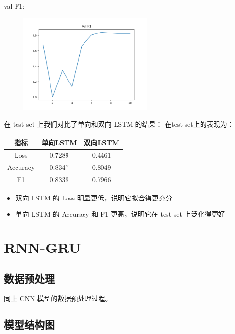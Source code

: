 \documentclass{article}
\begin{document}
\FloatBarrier

val F1:
\begin{figure}[h]
    \centering
    \includegraphics[width=0.6\textwidth]{../results/lstm_f1.png}
\end{figure}

\FloatBarrier

在 test set 上我们对比了单向和双向 LSTM 的结果：
在test set上的表现为：

\begin{table}[H]
    \centering
    \begin{tabular}{|c|c|c|}
        \hline 
        {\bf 指标} & {\bf 单向LSTM} & {\bf 双向LSTM}\\
        \hline
        Loss & 0.7289 & 0.4461\\
        \hline 
        Accuracy & 0.8347 & 0.8049\\
        \hline
        F1 & 0.8338 & 0.7966 \\
        \hline
    \end{tabular}
\end{table}

\begin{itemize}
    \item 双向 LSTM 的 Loss 明显更低，说明它拟合得更充分
    \item 单向 LSTM 的 Accuracy 和 F1 更高，说明它在 test set 上泛化得更好
\end{itemize}

\section{RNN-GRU}

\subsection{数据预处理}
同上 CNN 模型的数据预处理过程。

\subsection{模型结构图}
\end{document}
